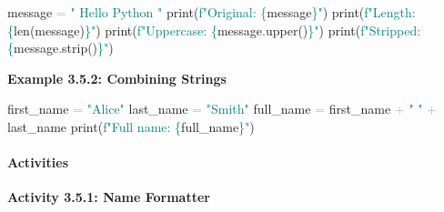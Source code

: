 \documentclass[
  justified,
  openright,
]{tufte-book}
\let\subsubsection\paragraph
\let\paragraph\paragraph
\newcommand{\BuiltInTok}[1]{#1}
\newcommand{\NormalTok}[1]{#1}
\newcommand{\OperatorTok}[1]{\textcolor{DarkGray}{#1}}
\newcommand{\SpecialCharTok}[1]{\textcolor{Teal}{#1}}
\newcommand{\SpecialStringTok}[1]{\textcolor{Teal}{#1}}
\newcommand{\StringTok}[1]{\textcolor{Teal}{#1}}
\newenvironment{Shaded}{%
  \begin{snugshade}
}{%
  \end{snugshade}
}
\let\subsubsection\paragraph
\let\paragraph\paragraph
\begin{document}
\begin{Shaded}
\begin{Highlighting}[]
\NormalTok{message }\OperatorTok{=} \StringTok{"  Hello Python  "}
\BuiltInTok{print}\NormalTok{(}\SpecialStringTok{f"Original: \textquotesingle{}}\SpecialCharTok{\{}\NormalTok{message}\SpecialCharTok{\}}\SpecialStringTok{\textquotesingle{}"}\NormalTok{)}
\BuiltInTok{print}\NormalTok{(}\SpecialStringTok{f"Length: }\SpecialCharTok{\{}\BuiltInTok{len}\NormalTok{(message)}\SpecialCharTok{\}}\SpecialStringTok{"}\NormalTok{)}
\BuiltInTok{print}\NormalTok{(}\SpecialStringTok{f"Uppercase: \textquotesingle{}}\SpecialCharTok{\{}\NormalTok{message}\SpecialCharTok{.}\NormalTok{upper()}\SpecialCharTok{\}}\SpecialStringTok{\textquotesingle{}"}\NormalTok{)}
\BuiltInTok{print}\NormalTok{(}\SpecialStringTok{f"Stripped: \textquotesingle{}}\SpecialCharTok{\{}\NormalTok{message}\SpecialCharTok{.}\NormalTok{strip()}\SpecialCharTok{\}}\SpecialStringTok{\textquotesingle{}"}\NormalTok{)}
\end{Highlighting}
\end{Shaded}

\textbf{Example 3.5.2: Combining Strings}

\begin{Shaded}
\begin{Highlighting}[]
\NormalTok{first\_name }\OperatorTok{=} \StringTok{"Alice"}
\NormalTok{last\_name }\OperatorTok{=} \StringTok{"Smith"}
\NormalTok{full\_name }\OperatorTok{=}\NormalTok{ first\_name }\OperatorTok{+} \StringTok{" "} \OperatorTok{+}\NormalTok{ last\_name}
\BuiltInTok{print}\NormalTok{(}\SpecialStringTok{f"Full name: }\SpecialCharTok{\{}\NormalTok{full\_name}\SpecialCharTok{\}}\SpecialStringTok{"}\NormalTok{)}
\end{Highlighting}
\end{Shaded}

\subsubsection{Activities}\label{activities-11}

\textbf{Activity 3.5.1: Name Formatter}
\end{document}
